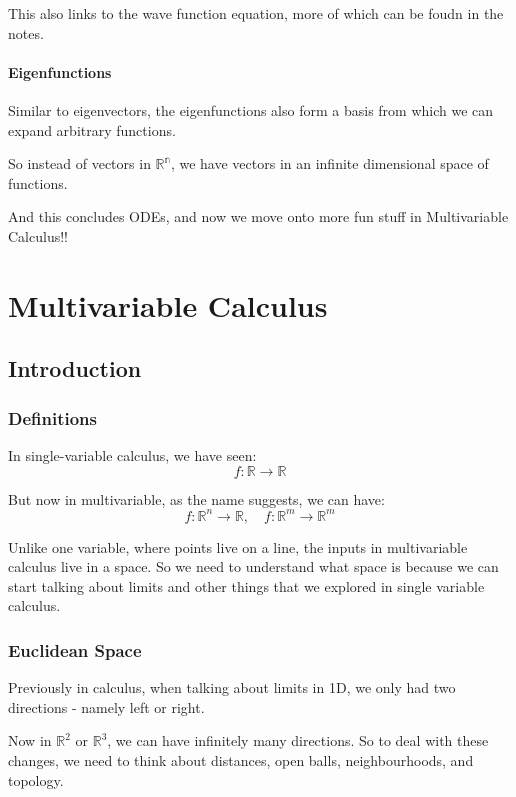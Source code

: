 This also links to the wave function equation, more of which can be foudn in the notes. 


\subsection{Eigenfunctions}

Similar to eigenvectors, the eigenfunctions also form a basis from which we can expand arbitrary functions. 

So instead of vectors in $\mathbb{R^n}$, we have vectors in an infinite dimensional space of functions. 

And this concludes ODEs, and now we move onto more fun stuff in Multivariable Calculus!! 

\part{Multivariable Calculus}


\chapter{Introduction}

\section{Definitions}

In single-variable calculus, we have seen: 
$$
f: \mathbb{R} \rightarrow \mathbb{R} 
$$

But now in multivariable, as the name suggests, we can have: 
$$
f: \mathbb{R}^n \rightarrow \mathbb{R} , \quad f: \mathbb{R}^m \rightarrow \mathbb{R}^m
$$

Unlike one variable, where points live on a line, the inputs in multivariable calculus live in a space. So we need to understand what space is because we can start talking about limits and other things that we explored in single variable calculus. 


\section{Euclidean Space}

Previously in calculus, when talking about limits in 1D, we only had two directions - namely left or right. 

Now in $\mathbb{R}^2$ or $\mathbb{R}^3$, we can have infinitely many directions. So to deal with these changes, we need to think about distances, open balls, neighbourhoods, and topology. 


